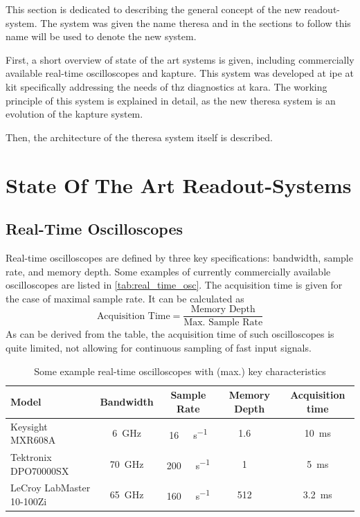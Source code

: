 This section is dedicated to describing the general concept of the new readout-system. 
The system was given the name \gls{theresa} and in the sections to follow  this name will be used to denote the new system.

First, a short overview of state of the art systems is given, including commercially available real-time oscilloscopes and \gls{kapture}.
This system was developed at \gls{ipe} at \gls{kit} specifically addressing the needs of \gls{thz} diagnostics at \gls{kara}.
The working principle of this system is explained in detail, as the new \gls{theresa} system is an evolution of the \gls{kapture} system. 

Then, the architecture of the \gls{theresa} system itself is described.

\section{State Of The Art Readout-Systems}
\subsection*{Real-Time Oscilloscopes}
Real-time oscilloscopes are defined by three key specifications: bandwidth, sample rate, and memory depth.
Some examples of currently commercially available oscilloscopes are listed in \autoref{tab:real_time_osc}.
The acquisition time is given for the case of maximal sample rate.
It can be calculated as 
\begin{equation}
	\text{Acquisition Time} = \frac{\text{Memory Depth}}{\text{Max. Sample Rate}}
\end{equation}
As can be derived from the table, the acquisition time of such oscilloscopes is quite limited, not allowing for continuous sampling of fast input signals. %
\begin{table}[tbh]
	\caption[Real Time Oscilloscopes Examples]{Some example real-time oscilloscopes with (max.) key characteristics}
	\label{tab:real_time_osc}
	\centering
	\begin{tabularx}{\textwidth}{Xcccc}
		\toprule
		\textbf{Model}            & \textbf{Bandwidth} &         \textbf{Sample Rate}         &  \textbf{Memory Depth}  & \textbf{Acquisition time} \\ \midrule
		Keysight MXR608A          &    \SI{6}{\GHz}    & \SI{16}{\giga \sample \per \second}  & \SI{1.6}{\giga \sample} &  \SI{10}{\milli \second}  \\
		Tektronix DPO70000SX      &   \SI{70}{\GHz}    & \SI{200}{\giga \sample \per \second} &  \SI{1}{\giga \sample}  &  \SI{5}{\milli \second}   \\
		LeCroy LabMaster 10-100Zi &   \SI{65}{\GHz}    & \SI{160}{\giga \sample \per \second} & \SI{512}{\mega \sample} & \SI{3.2}{\milli \second}  \\ \bottomrule
	\end{tabularx}
\end{table}



